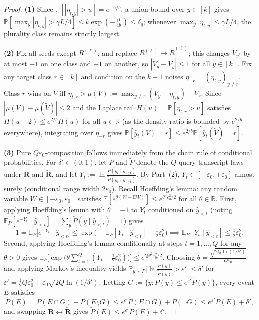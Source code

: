 \documentclass[11pt]{article}
\theoremstyle{definition}
\newcommand{\R}{\mathbb{R}}
\newcommand{\E}{\mathbb{E}}
\newcommand{\Prob}{\mathbb{P}}
\begin{document}
\begin{proof}
\textbf{(1)} Since $\Prob[|\eta_{t, y}| > u] = e^{-u/b}$, a union bound over $y \in [k]$ gives $\Prob[\max_y |\eta_{t,y}| > \gamma L / 4] \le k \exp(-\frac{\gamma L}{4b}) \le \delta_q$; whenever $\max_y |\eta_{t,y}| \le \gamma L / 4$, the plurality class remains strictly largest.

\textbf{(2)} Fix all seeds except $R^{(\ell)}$, and replace $R^{(\ell)} \to \tilde{R}^{(\ell)}$; this changes $V_{y^*}$ by at most $-1$ on one class and $+1$ on another, so $|V_y - \tilde{V}_y| \le 1$ for all $y \in [k]$. Fix any target class $r \in [k]$ and condition on the $k-1$ noises $\eta_{-r} = (\eta_{t, y})_{y \ne r}$. Class $r$ wins on $V$ iff $\eta_{t, r} > \mu(V) := \max_{y \ne r} (V_y + \eta_{t, y}) - V_r$. Since $|\mu(V) - \mu(\tilde{V})| \le 2$ and the Laplace tail $H(u) = \Prob[\eta_{t,r} > u]$ satisfies $H(u - 2) \le e^{2/b} H(u)$ for all $u \in \R$ (as the density ratio is bounded by $e^{2/b}$ everywhere), integrating over $\eta_{-r}$ gives $\Prob[\hat{y}_t(V) = r] \le e^{2/b} \Prob[\hat{y}_t(\tilde{V}) = r]$.

\textbf{(3)} Pure $Q\varepsilon_0$-composition follows immediately from the chain rule of conditional probabilities. For $\delta' \in (0, 1)$, let $P$ and $\tilde{P}$ denote the $Q$-query transcript laws under $\mathbf{R}$ and $\tilde{\mathbf{R}}$, and let $Y_t := \ln \frac{P(\hat{y}_t \mid \hat{y}_{<t})}{\tilde{P}(\hat{y}_t \mid \hat{y}_{<t})}$. By Part~(2), $Y_t \in [-\varepsilon_0, +\varepsilon_0]$ almost surely (conditional range width $2\varepsilon_0$). Recall Hoeffding's lemma: any random variable $W \in [-\varepsilon_0, \varepsilon_0]$ satisfies $\E[e^{\theta(W - \E W)}] \le e^{\theta^2 \varepsilon_0^2 / 2}$ for all $\theta \in \R$. First, applying Hoeffding's lemma with $\theta = -1$ to $Y_t$ conditioned on $\hat{y}_{<t}$ (noting $\E_P[e^{-Y_t} \mid \hat{y}_{<t}] = \sum_y \tilde{P}(y \mid \hat{y}_{<t}) = 1$) gives
\[
    1 = \E_P\big[e^{-Y_t} \mid \hat{y}_{<t}\big] \le \exp\Big(-\E_P[Y_t \mid \hat{y}_{<t}] + \tfrac{1}{2}\varepsilon_0^2\Big) \implies \E_P[Y_t \mid \hat{y}_{<t}] \le \tfrac{1}{2}\varepsilon_0^2.
\]
Second, applying Hoeffding's lemma conditionally at steps $t = 1, \dots, Q$ for any $\theta > 0$ gives $\E_P\big[\exp\big(\theta \sum_{t=1}^Q (Y_t - \frac{1}{2}\varepsilon_0^2)\big)\big] \le e^{Q \theta^2 \varepsilon_0^2 / 2}$. Choosing $\theta = \frac{\sqrt{2 Q \ln(1/\delta')}}{Q \varepsilon_0}$ and applying Markov's inequality yields $\Prob_{y \sim P}\big[\ln\frac{P(y)}{\tilde{P}(y)} > \varepsilon'\big] \le \delta'$ for $\varepsilon' = \frac{1}{2} Q \varepsilon_0^2 + \varepsilon_0 \sqrt{2 Q \ln(1/\delta')}$. Letting $G := \{y : P(y) \le e^{\varepsilon'} \tilde{P}(y)\}$, every event $E$ satisfies
\[
    P(E) = P(E \cap G) + P(E \setminus G) \le e^{\varepsilon'} \tilde{P}(E \cap G) + P(\neg G) \le e^{\varepsilon'} \tilde{P}(E) + \delta',
\]
and swapping $\mathbf{R} \leftrightarrow \tilde{\mathbf{R}}$ gives $\tilde{P}(E) \le e^{\varepsilon'} P(E) + \delta'$.
\end{proof}
\end{document}
